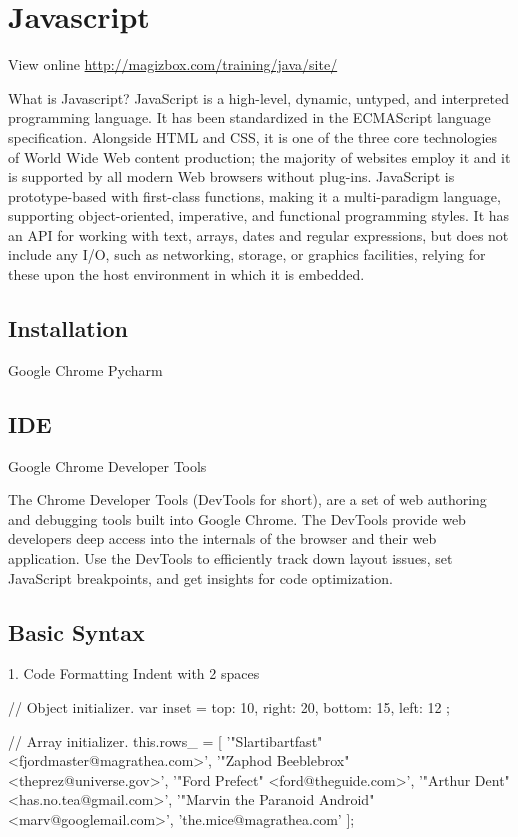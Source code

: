 \chapter{Javascript}

View online \href{http://magizbox.com/training/java/site/}{http://magizbox.com/training/java/site/}

What is Javascript?
JavaScript is a high-level, dynamic, untyped, and interpreted programming language. It has been standardized in the ECMAScript language specification. Alongside HTML and CSS, it is one of the three core technologies of World Wide Web content production; the majority of websites employ it and it is supported by all modern Web browsers without plug-ins. JavaScript is prototype-based with first-class functions, making it a multi-paradigm language, supporting object-oriented, imperative, and functional programming styles. It has an API for working with text, arrays, dates and regular expressions, but does not include any I/O, such as networking, storage, or graphics facilities, relying for these upon the host environment in which it is embedded.


\section{Installation}

Google Chrome
Pycharm

\section{IDE}

Google Chrome Developer Tools

The Chrome Developer Tools (DevTools for short), are a set of web authoring and debugging tools built into Google Chrome. The DevTools provide web developers deep access into the internals of the browser and their web application. Use the DevTools to efficiently track down layout issues, set JavaScript breakpoints, and get insights for code optimization.

\section{Basic Syntax}

1. Code Formatting
Indent with 2 spaces

// Object initializer.
var inset = {
  top: 10,
  right: 20,
  bottom: 15,
  left: 12
};

// Array initializer.
this.rows_ = [
  '"Slartibartfast" <fjordmaster@magrathea.com>',
  '"Zaphod Beeblebrox" <theprez@universe.gov>',
  '"Ford Prefect" <ford@theguide.com>',
  '"Arthur Dent" <has.no.tea@gmail.com>',
  '"Marvin the Paranoid Android" <marv@googlemail.com>',
  'the.mice@magrathea.com'
];


